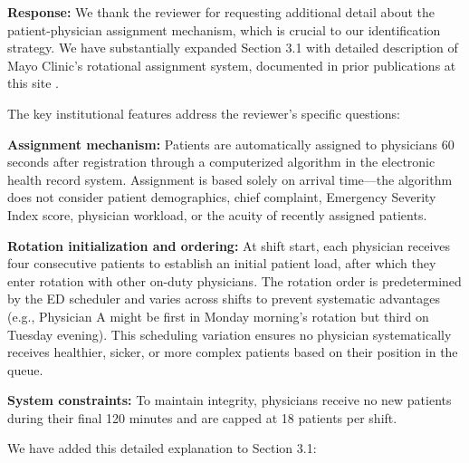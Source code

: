 \documentclass[11pt]{article}
\newcommand{\1}{\hbox{\rm 1\kern-.35em 1}}
\begin{document}
\noindent\textbf{Response:} \color{blue}We thank the reviewer for requesting additional detail about the patient-physician assignment mechanism, which is crucial to our identification strategy. We have substantially expanded Section 3.1 with detailed description of Mayo Clinic's rotational assignment system, documented in prior publications at this site \cite{Traub2016, traub2016emergency, Traub2018}. 

The key institutional features address the reviewer's specific questions:

\textbf{Assignment mechanism:} Patients are automatically assigned to physicians 60 seconds after registration through a computerized algorithm in the electronic health record system. Assignment is based solely on arrival time—the algorithm does not consider patient demographics, chief complaint, Emergency Severity Index score, physician workload, or the acuity of recently assigned patients.

\textbf{Rotation initialization and ordering:} At shift start, each physician receives four consecutive patients to establish an initial patient load, after which they enter rotation with other on-duty physicians. The rotation order is predetermined by the ED scheduler and varies across shifts to prevent systematic advantages (e.g., Physician A might be first in Monday morning's rotation but third on Tuesday evening). This scheduling variation ensures no physician systematically receives healthier, sicker, or more complex patients based on their position in the queue.

\textbf{System constraints:} To maintain integrity, physicians receive no new patients during their final 120 minutes and are capped at 18 patients per shift.

We have added this detailed explanation to Section 3.1:
\end{document}
